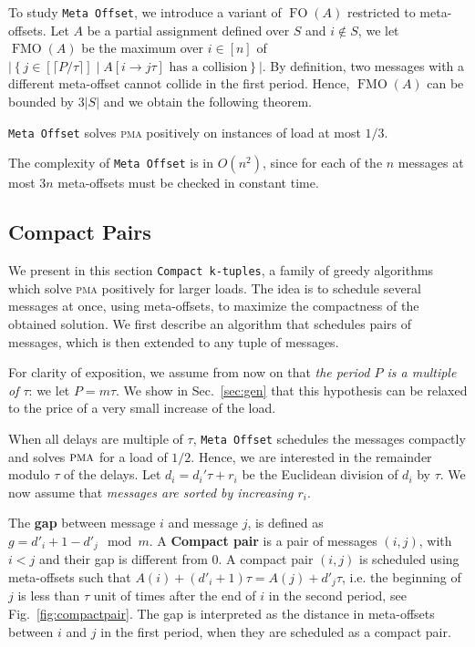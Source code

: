 \documentclass[a4paper,UKenglish,cleveref, autoref, thm-restate]{lipics-v2019}
\DeclareMathOperator{\Fo}{FO}
\DeclareMathOperator{\Fmo}{FMO}
\newcommand\pma{\textsc{pma}\xspace}
\newcommand\metaoffset{\texttt{Meta Offset}\xspace}
\begin{document}
To study \metaoffset, we introduce a variant of $\Fo(A)$ restricted to meta-offsets.
 Let $A$ be a partial assignment defined over $S$ and $i\notin S$, we let $\Fmo(A)$ be the maximum over $i \in [n]$ of $|\left\{ j \in [\lceil P / \tau \rceil] \mid A[i \rightarrow j\tau] \text{ has a collision}\right\}|$.
 By definition, two messages with a different meta-offset cannot collide in the first period. Hence, $\Fmo(A)$ can be bounded by $3|S|$ and we obtain the following theorem.


\begin{theorem}\label{th:metaoffset}
\metaoffset solves \pma positively on instances of load at most $1/3$.
\end{theorem}

The complexity of \metaoffset is in $O(n^2)$, since for each of the $n$ messages at most $3n$ meta-offsets must be checked in constant time. 

\subsection{Compact Pairs}

We present in this section \texttt{Compact k-tuples}, a family of greedy algorithms which solve \pma positively for larger loads. The idea is to schedule several messages at once, using meta-offsets, to maximize the compactness of the obtained solution. We first describe an algorithm that schedules pairs of messages, which is then extended to any tuple of messages. 

For clarity of exposition, we assume from now on that \emph{the period $P$ is a multiple of $\tau$}: we let $P = m\tau$. We show in Sec.~\ref{sec:gen} that this hypothesis can be relaxed to the price of a very small increase of the load. 


When all delays are multiple of $\tau$, \metaoffset schedules the messages compactly and solves $\pma$ for a load of $1/2$. Hence, we are interested in the remainder modulo $\tau$ of the delays. Let $d_i = d_{i}'\tau + r_i$ be the Euclidean division of $d_i$ by $\tau$. We now assume that \emph{messages are sorted by increasing $r_i$}.

The \textbf{gap} between message $i$ and message $j$, is defined as $g = d'_{i} + 1 - d'_{j} \mod m$.
A \textbf{Compact pair} is a pair of messages $(i,j)$, with $i < j$ and their gap is different from $0$. A compact pair $(i,j)$ is scheduled using meta-offsets such that $A(i) + (d'_i+1)\tau = A(j) + d'_j\tau$, i.e. the beginning of $j$ is less than $\tau$ unit of times after the end of $i$ in the second period, see Fig.~\ref{fig:compactpair}. The gap is interpreted as the distance in meta-offsets between $i$ and $j$ in the first period, when they are scheduled as a compact pair.
\end{document}
